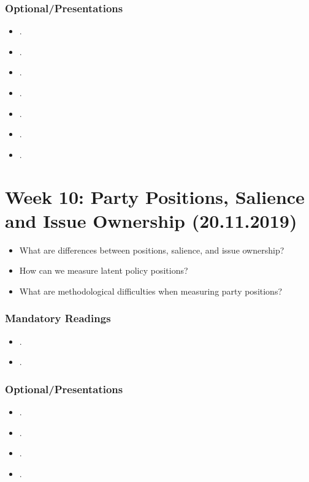 \documentclass[abstract=on,parskip=full,headings=standardclasses,fontsize=11pt,paper=a4]{scrartcl}
\begin{document}
\subsubsection*{Optional/Presentations}
\begin{itemize}
\item {}.
\item {}.
\item {}.
\item {}.
\item {}.
\item {}.
\item {}.
\end{itemize}



\section{Week 10:   Party Positions, Salience and Issue Ownership (20.11.2019)}


\begin{itemize}
\renewcommand\labelitemi{--}
\item What are differences between positions, salience, and issue ownership?
\item How can we measure latent policy positions? 
\item What are methodological difficulties when measuring party positions?
\end{itemize}

\subsubsection*{Mandatory Readings}
\begin{itemize}
\item {}.
\item {}.
\end{itemize}


\subsubsection*{Optional/Presentations}
\begin{itemize}
\item {}.
\item {}.
\item {}.
\item {}.
\end{itemize}
\end{document}
